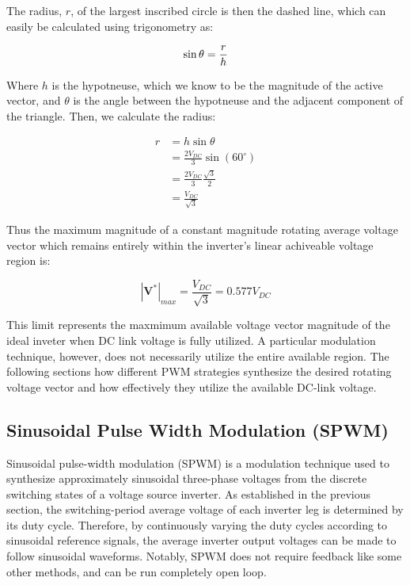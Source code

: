 \documentclass{article}
\begin{document}
The radius, $r$, of the largest inscribed circle is then the dashed line, which can easily be calculated using trigonometry as:

\begin{equation}
    \sin\theta = \frac{r}{h} \\
\end{equation}

Where $h$ is the hypotneuse, which we know to be the magnitude of the active vector, and $\theta$ is the angle between the hypotneuse and the adjacent component of the triangle. Then, we calculate the radius:

\begin{align}
    r &= h\sin\theta \\
    &= \frac{2V_{DC}}{3}\sin(60^\circ) \\
    &= \frac{2V_{DC}}{3}\frac{\sqrt{3}}{2} \\
    &= \frac{V_{DC}}{\sqrt{3}} 
\end{align}

Thus the maximum magnitude of a constant magnitude rotating average voltage vector which remains entirely within the inverter's linear achiveable voltage region is:

\begin{equation}
    |\mathbf{V}^*|_{max} = \frac{V_{DC}}{\sqrt{3}} = 0.577V_{DC}
\end{equation}

This limit represents the maxmimum available voltage vector magnitude of the ideal inveter when DC link voltage is fully utilized. A particular modulation technique, however, does not necessarily utilize the entire available region. The following sections how different PWM strategies synthesize the desired rotating voltage vector and how effectively they utilize the available DC-link voltage.



\subsection{Sinusoidal Pulse Width Modulation (SPWM)}
\label{sec:spwm}

Sinusoidal pulse-width modulation (SPWM) is a modulation technique used to synthesize approximately sinusoidal three-phase voltages from the discrete switching states of a voltage source inverter. As established in the previous section, the switching-period average voltage of each inverter leg is determined by its duty cycle. Therefore, by continuously varying the duty cycles according to sinusoidal reference signals, the average inverter output voltages can be made to follow sinusoidal waveforms. Notably, SPWM does not require feedback like some other methods, and can be run completely open loop.
\end{document}
